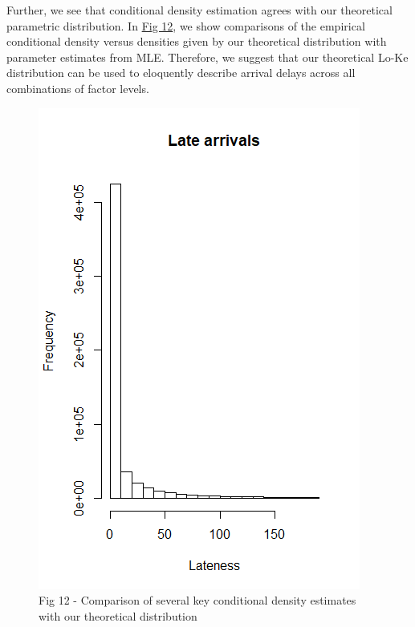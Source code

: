 \documentclass[12pt, a4paper, openany]{book}
\newcommand\tab[1][1cm]{\hspace*{#1}}
\begin{document}
	\tab Further, we see that conditional density estimation agrees with our theoretical parametric distribution. In \underline{Fig 12}, we show comparisons of the empirical conditional density versus densities given by our theoretical distribution with parameter estimates from MLE. Therefore, we suggest that our theoretical Lo-Ke distribution can be used to eloquently describe arrival delays across all combinations of factor levels. \\
			\begin{figure}
			\centering
	 		\includegraphics[width = .45 \textwidth]{../figures/LateArrivalsHistogram}
	 		\caption{Fig 12  - Comparison of several key conditional density estimates with our theoretical distribution}
	 		\end{figure}
\end{document}
